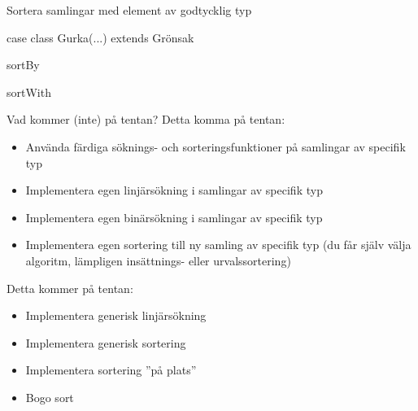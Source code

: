 \begin{Slide}{Sortera samlingar med element av godtycklig typ}

case class Gurka(...) extends Grönsak

sortBy

sortWith

\end{Slide}

\begin{Slide}{Vad kommer (inte) på tentan?}
Detta  komma på tentan:
\begin{itemize}
\item Använda färdiga söknings- och sorteringsfunktioner på samlingar av specifik typ
\item Implementera egen linjärsökning i samlingar av specifik typ
\item Implementera egen binärsökning i samlingar av specifik typ
\item Implementera egen sortering till ny samling av specifik typ (du får själv välja algoritm, lämpligen insättnings- eller urvalssortering)

\end{itemize}
Detta kommer  på tentan:
\begin{itemize}
\item Implementera generisk linjärsökning 
\item Implementera generisk sortering
\item Implementera sortering ''på plats''
\item Bogo sort
\end{itemize}
\end{Slide}

\fi












